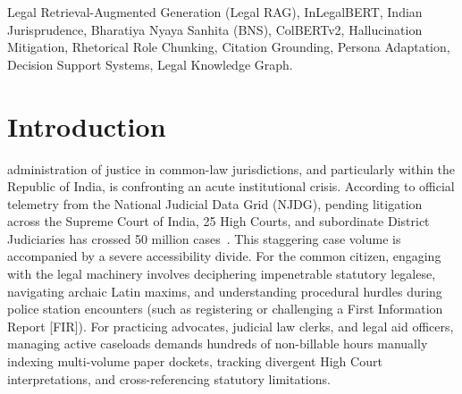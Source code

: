 \documentclass[conference]{IEEEtran}
\begin{document}
\begin{IEEEkeywords}
Legal Retrieval-Augmented Generation (Legal RAG), InLegalBERT, Indian Jurisprudence, Bharatiya Nyaya Sanhita (BNS), ColBERTv2, Hallucination Mitigation, Rhetorical Role Chunking, Citation Grounding, Persona Adaptation, Decision Support Systems, Legal Knowledge Graph.
\end{IEEEkeywords}

\section{Introduction}
 administration of justice in common-law jurisdictions, and particularly within the Republic of India, is confronting an acute institutional crisis. According to official telemetry from the National Judicial Data Grid (NJDG), pending litigation across the Supreme Court of India, 25 High Courts, and subordinate District Judiciaries has crossed 50 million cases~\cite{njdg2024}. This staggering case volume is accompanied by a severe accessibility divide. For the common citizen, engaging with the legal machinery involves deciphering impenetrable statutory legalese, navigating archaic Latin maxims, and understanding procedural hurdles during police station encounters (such as registering or challenging a First Information Report [FIR]). For practicing advocates, judicial law clerks, and legal aid officers, managing active caseloads demands hundreds of non-billable hours manually indexing multi-volume paper dockets, tracking divergent High Court interpretations, and cross-referencing statutory limitations.
\end{document}
